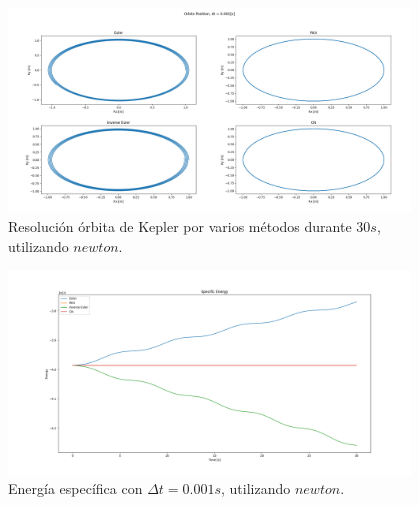 \documentclass[12pt,a4paper]{article}
\begin{document}
\begin{figure}[H] 
	\centering
	\includegraphics[width=0.95\textwidth]{FIGURES/dt0.001_newton_pos.png}
	\caption{Resolución órbita de Kepler por varios métodos durante 30$s$, utilizando $newton$.}
\end{figure}
\begin{figure}[H] 
	\centering
	\includegraphics[width=0.95\textwidth]{FIGURES/dt0.001_fsolve_energy.png}
	\caption{Energía específica con $\Delta t = 0.001 s$, utilizando $newton$.}
\end{figure}
\end{document}
